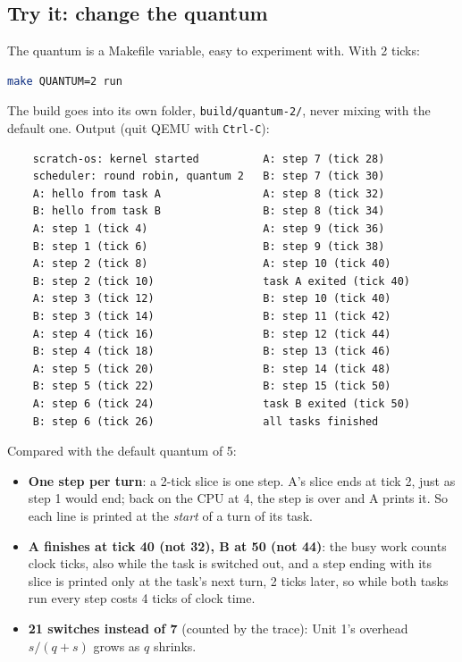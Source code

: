 \subsection{Try it: change the quantum}
The quantum is a Makefile variable, easy to experiment with. With 2 ticks:
\begin{lstlisting}[language=bash]
    make QUANTUM=2 run
\end{lstlisting}
The build goes into its own folder, \texttt{build/quantum-2/}, never mixing with the default one. Output (quit QEMU with \texttt{Ctrl-C}):
\begin{verbatim}
    scratch-os: kernel started          A: step 7 (tick 28)
    scheduler: round robin, quantum 2   B: step 7 (tick 30)
    A: hello from task A                A: step 8 (tick 32)
    B: hello from task B                B: step 8 (tick 34)
    A: step 1 (tick 4)                  A: step 9 (tick 36)
    B: step 1 (tick 6)                  B: step 9 (tick 38)
    A: step 2 (tick 8)                  A: step 10 (tick 40)
    B: step 2 (tick 10)                 task A exited (tick 40)
    A: step 3 (tick 12)                 B: step 10 (tick 40)
    B: step 3 (tick 14)                 B: step 11 (tick 42)
    A: step 4 (tick 16)                 B: step 12 (tick 44)
    B: step 4 (tick 18)                 B: step 13 (tick 46)
    A: step 5 (tick 20)                 B: step 14 (tick 48)
    B: step 5 (tick 22)                 B: step 15 (tick 50)
    A: step 6 (tick 24)                 task B exited (tick 50)
    B: step 6 (tick 26)                 all tasks finished
\end{verbatim}
Compared with the default quantum of 5:
\begin{itemize}
    \item \textbf{One step per turn}: a 2-tick slice is one step. A's slice ends at tick 2, just as step 1 would end; back on the CPU at 4, the step is over and A prints it. So each line is printed at the \emph{start} of a turn of its task.
    \item \textbf{A finishes at tick 40 (not 32), B at 50 (not 44)}: the busy work counts clock ticks, also while the task is switched out, and a step ending with its slice is printed only at the task's next turn, 2 ticks later, so while both tasks run every step costs 4 ticks of clock time.
    \item \textbf{21 switches instead of 7} (counted by the trace): Unit 1's overhead $s/(q+s)$ grows as $q$ shrinks.
\end{itemize}


